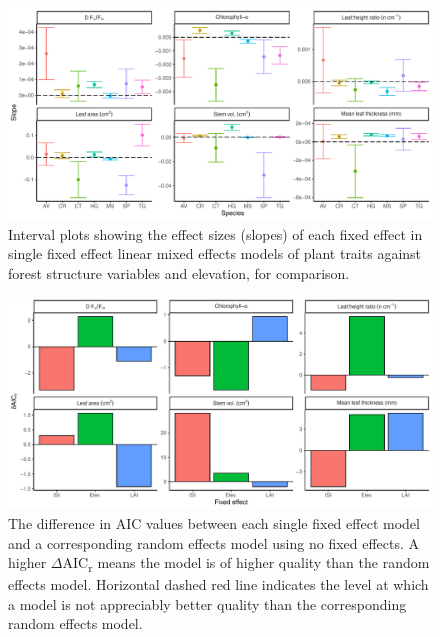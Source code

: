 \documentclass[a4paper, 11pt]{article}
\begin{document}
\begin{figure}[H]
\includegraphics[width=\textwidth]{traits_elev_slopes}
\centering
\caption{Interval plots showing the effect sizes (slopes) of each fixed effect in single fixed effect linear mixed effects models of plant traits against forest structure variables and elevation, for comparison.}
\label{fig:traits_elev_slopes}
\end{figure}

\begin{figure}[H]
\includegraphics[width=\textwidth]{single_pred_daic}
\centering
\caption{The difference in AIC values between each single fixed effect model and a corresponding random effects model using no fixed effects. A higher $\Delta$AIC\textsubscript{r} means the model is of higher quality than the random effects model. Horizontal dashed red line indicates the level at which a model is not appreciably better quality than the corresponding random effects model.}
\label{fig:single_pred_daic}
\end{figure}
\end{document}
